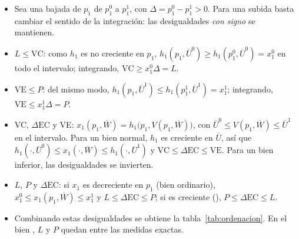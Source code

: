 \documentclass[11pt]{article}
\begin{document}
\begin{itemize}
\item Sea una bajada de $p_1$ de $p_1^0$ a $p_1^1$, con $\Delta=p_1^0-p_1^1>0$. Para una subida basta cambiar el sentido de la integración: las desigualdades \emph{con signo} se mantienen.
\item $L\leq \mathrm{VC}$: como $h_1$ es no creciente en $p_1$, $h_1(p_1,\overline{U}^0)\geq h_1(p_1^0,\overline{U}^0)=x_1^0$ en todo el intervalo; integrando, $\mathrm{VC}\geq x_1^0\Delta=L$.\findemo
\item $\mathrm{VE}\leq P$: del mismo modo, $h_1(p_1,\overline{U}^1)\leq h_1(p_1^1,\overline{U}^1)=x_1^1$; integrando, $\mathrm{VE}\leq x_1^1\Delta=P$.\findemo
\item VC, $\Delta\mathrm{EC}$ y VE: $x_1(p_1,\overline{W})=h_1\big(p_1,V(p_1,\overline{W})\big)$, con $\overline{U}^0\leq V(p_1,\overline{W})\leq\overline{U}^1$ en el intervalo. Para un bien normal, $h_1$ es creciente en $\overline{U}$, así que $h_1(\cdot,\overline{U}^0)\leq x_1(\cdot,\overline{W})\leq h_1(\cdot,\overline{U}^1)$ y $\mathrm{VC}\leq\Delta\mathrm{EC}\leq \mathrm{VE}$. Para un bien inferior, las desigualdades se invierten.\findemo
\item $L$, $P$ y $\Delta\mathrm{EC}$: si $x_1$ es decreciente en $p_1$ (bien ordinario), $x_1^0\leq x_1(p_1,\overline{W})\leq x_1^1$ y $L\leq\Delta\mathrm{EC}\leq P$; si es creciente (), $P\leq\Delta\mathrm{EC}\leq L$.\findemo
\item Combinando estas desigualdades se obtiene la tabla~\ref{tab:ordenacion}. En el bien , $L$ y $P$ quedan entre las medidas exactas.
\end{itemize}
\end{document}
